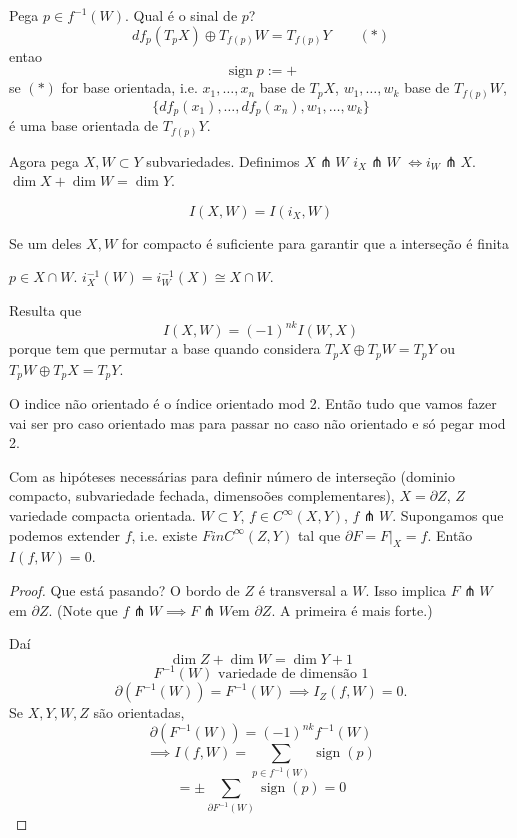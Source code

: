 \begin{defn}\leavevmode
Pega \(p \in f^{-1}(W)\). Qual é o sinal de \(p\)?
 \[df_p(T_pX) \oplus  T_{f(p)}W = T_{f(p)}Y\qquad (*)\]
entao
\[\operatorname{sign}p:=+\]
se \((*)\) for base orientada, i.e. \(x_1,\ldots,x_n\) base de \(T_pX\), \(w_1,\ldots,w_k\) base de \(T_{f(p)}W\),
\[\{df_p(x_1),\ldots,df_p(x_n),w_1,\ldots,w_k\}\]
é uma base orientada de \(T_{f(p)}Y\).

\begin{defn}\leavevmode
Agora pega \(X, W \subset Y\) subvariedades. Definimos \(X \pitchfork W\) \(i_X \pitchfork  W\) \(\iff i_W \pitchfork  X\). \(\dim X + \dim W= \dim Y\).

\[I(X,W) = I(i_X,W)\]

\begin{remark}\leavevmode
Se um deles \(X,W\) for compacto é suficiente para garantir que a interseção é finita
\end{remark}

\(p \in X \cap W\). \(i_X^{-1}(W)=i^{-1}_W(X)\cong X \cap W\).

Resulta que 
\[I(X,W)= (-1)^{nk}I(W,X)\]
porque tem que permutar a base quando considera \(T_pX \oplus  T_pW = T_pY\) ou \(T_pW \oplus  T_pX= T_pY\).
\end{defn}

\end{defn}

\begin{remark}\leavevmode
O indice não orientado é o índice orientado mod 2. Então tudo que vamos fazer vai ser pro caso orientado mas para passar no caso não orientado e só pegar mod 2.
\end{remark}

\begin{prop}\leavevmode
	Com as hipóteses necessárias para definir número de interseção (dominio compacto, subvariedade fechada, dimensoões complementares), \(X = \partial  Z\), \(Z\) variedade compacta orientada. \(W \subset Y\), \(f \in C^\infty (X,Y)\), \(f \pitchfork  W\). Supongamos que podemos extender \(f\), i.e. existe \(F in C^\infty (Z,Y)\) tal que \(\partial F=F |_{ X}=f\). Então \(I(f,W)=0\).
\end{prop}

\begin{proof}\leavevmode
Que está pasando? O bordo de \(Z\) é transversal a \(W\). Isso implica  \(F \pitchfork W\) em \(\partial Z\). (Note que \(f \pitchfork  W \implies F \pitchfork  W\)em \(\partial Z\). A primeira é mais forte.)

Daí
\[\dim Z+ \dim W= \dim Y+1\]
\[F^{-1}(W) \text{ variedade de dimensão 1} \]
\[\partial (F^{-1}(W))= F^{-1}(W) \implies I_Z(f,W)=0. \]
Se \(X,Y,W,Z\) são orientadas,
\[\partial (F^{-1}(W))= (-1)^{nk}f^{-1}(W)\]
\[\implies I(f,W) = \sum_{p \in f^{-1}(W)}\operatorname{sign}(p)\]
\[= \pm  \sum_{ \partial  F^{-1}(W)}\operatorname{ sign}(p)=0\]
\end{proof}


